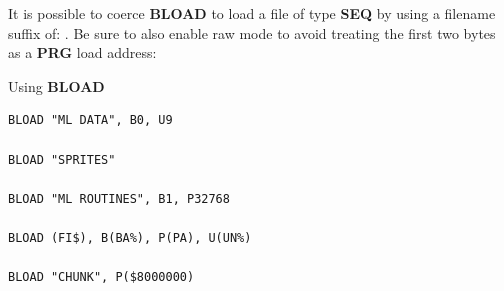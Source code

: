 \begin{description}[leftmargin=2cm,style=nextline]
                  It is possible to coerce {\bf BLOAD} to load a file of type {\bf SEQ} by using a filename suffix of: . Be sure to also enable raw mode to avoid treating the first two bytes as a {\bf PRG} load address: 

\item [Examples:] Using {\bf BLOAD}

\begin{tcolorbox}[colback=black,coltext=white]
\verbatimfont{\codefont}
\begin{verbatim}
BLOAD "ML DATA", B0, U9

BLOAD "SPRITES"

BLOAD "ML ROUTINES", B1, P32768

BLOAD (FI$), B(BA%), P(PA), U(UN%)

BLOAD "CHUNK", P($8000000)
\end{verbatim}
\end{tcolorbox}
\end{description}


\newpage
